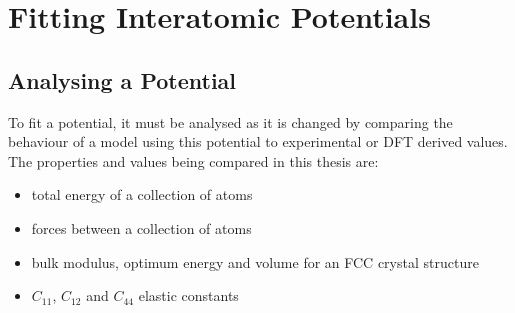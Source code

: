 \section{Fitting Interatomic Potentials}

\subsection{Analysing a Potential}

To fit a potential, it must be analysed as it is changed by comparing the behaviour of a model using this potential to experimental or DFT derived values.  The properties and values being compared in this thesis are:

\begin{itemize}
\item total energy of a collection of atoms
\item forces between a collection of atoms
\item bulk modulus, optimum energy and volume for an FCC crystal structure
\item $C_{11}$, $C_{12}$ and $C_{44}$ elastic constants
\end{itemize}



